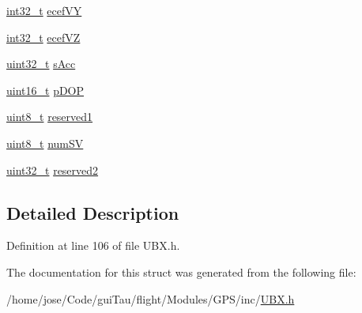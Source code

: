 \begin{DoxyCompactItemize}
\item 
\hyperlink{group___n_a_m_e_gafd12020da5a235dfcf0c3c748fb5baed}{int32\-\_\-t} \hyperlink{group___g_s_p_module_ga579b66433d3effbb0ad527acae2f8379}{ecef\-V\-Y}
\item 
\hyperlink{group___n_a_m_e_gafd12020da5a235dfcf0c3c748fb5baed}{int32\-\_\-t} \hyperlink{group___g_s_p_module_ga3bc6214c289d81550f8750382540c2ec}{ecef\-V\-Z}
\item 
\hyperlink{stdint_8h_a435d1572bf3f880d55459d9805097f62}{uint32\-\_\-t} \hyperlink{group___g_s_p_module_ga2f523fbe2cf2e2eeb885e5e54d633f17}{s\-Acc}
\item 
\hyperlink{stdint_8h_a273cf69d639a59973b6019625df33e30}{uint16\-\_\-t} \hyperlink{group___g_s_p_module_gac6ab9d0036a83196d847e1c4ed2389fb}{p\-D\-O\-P}
\item 
\hyperlink{stdint_8h_aba7bc1797add20fe3efdf37ced1182c5}{uint8\-\_\-t} \hyperlink{group___g_s_p_module_gaa1df4884b23e42bf16bc237341d5001c}{reserved1}
\item 
\hyperlink{stdint_8h_aba7bc1797add20fe3efdf37ced1182c5}{uint8\-\_\-t} \hyperlink{group___g_s_p_module_gab171c210f9cc253577d01441b9e1c439}{num\-S\-V}
\item 
\hyperlink{stdint_8h_a435d1572bf3f880d55459d9805097f62}{uint32\-\_\-t} \hyperlink{group___g_s_p_module_ga2367f145076ebc428ec4ef901cdda367}{reserved2}
\end{DoxyCompactItemize}


\subsection{Detailed Description}


Definition at line 106 of file U\-B\-X.\-h.



The documentation for this struct was generated from the following file\-:\begin{DoxyCompactItemize}
\item 
/home/jose/\-Code/gui\-Tau/flight/\-Modules/\-G\-P\-S/inc/\hyperlink{_u_b_x_8h}{U\-B\-X.\-h}\end{DoxyCompactItemize}
